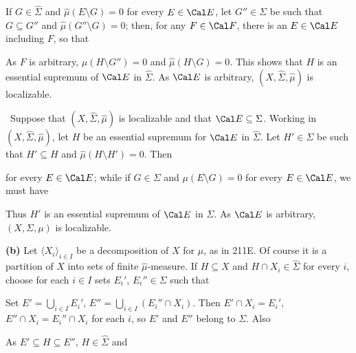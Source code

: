 {\noindent If $G\in\hat\Sigma$ and
$\hat\mu(E\setminus G)=0$ for every $E\in\Cal E$, let $G''\in\Sigma$ be
such that $G\subseteq G''$ and $\hat\mu(G''\setminus G)=0$;  then, for
any $F\in\Cal F$, there is an
$E\in\Cal E$ including $F$, so that


\noindent As $F$ is arbitrary, $\mu(H\setminus G'')=0$ and
$\hat\mu(H\setminus G)=0$.   This shows that $H$ is an essential
supremum of $\Cal E$ in $\hat\Sigma$.   As $\Cal E$ is arbitrary,
$(X,\hat\Sigma,\hat\mu)$ is localizable.

\medskip

\qquad\grheadb\ Suppose that $(X,\hat\Sigma,\hat\mu)$ is
localizable and that $\Cal E\subseteq\Sigma$.   Working in
$(X,\hat\Sigma,\hat\mu)$, let $H$ be an essential supremum for $\Cal E$
in $\hat\Sigma$.   Let $H'\in\Sigma$ be such that $H'\subseteq H$ and
$\hat\mu(H\setminus H')=0$.   Then


\noindent for every $E\in\Cal E$;  while if $G\in\Sigma$ and
$\mu(E\setminus G)=0$ for every $E\in\Cal E$, we must have


\noindent   Thus $H'$ is an essential supremum of $\Cal E$ in $\Sigma$.
As $\Cal E$ is arbitrary, $(X,\Sigma,\mu)$ is localizable.

\medskip

{\bf (b)} Let $\langle X_i\rangle_{i\in I}$ be a decomposition of $X$
for $\mu$, as in 211E.    Of course it is a partition of $X$ into
sets of finite $\hat\mu$-measure.   If $H\subseteq X$ and
$H\cap X_i\in\hat\Sigma$ for every $i$, choose for each $i\in I$ sets $E_i'$, $E_i''\in\Sigma$ such that


\noindent   Set $E'=\bigcup_{i\in I}E_i'$,
$E''=\bigcup_{i\in I}(E_i''\cap X_i)$.   Then $E'\cap X_i=E_i'$,
$E''\cap X_i=E_i''\cap X_i$ for
each $i$, so $E'$ and $E''$ belong to $\Sigma$.   Also


\noindent As $E'\subseteq H\subseteq E''$, $H\in\hat\Sigma$ and


}
